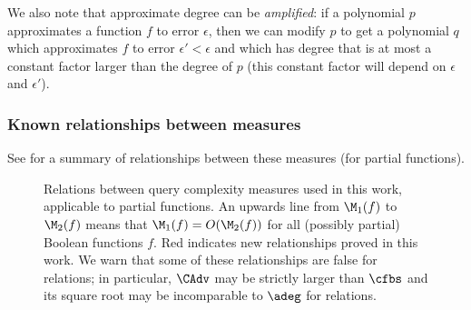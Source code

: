 We also note that approximate degree can be \emph{amplified}:
if a polynomial $p$ approximates a function $f$ to error
$\epsilon$, then we can modify $p$ to get a polynomial $q$
which approximates $f$ to error $\epsilon'<\epsilon$
and which has degree that is at most a constant factor
larger than the degree of $p$ (this constant
factor will depend on $\epsilon$ and $\epsilon'$).

\subsubsection{Known relationships between measures}

See  for a summary of relationships
between these measures (for partial functions).

\begin{figure}
\centering
    \caption{Relations between query complexity
    measures used in this work, applicable to partial functions.
    An upwards line from $\M_1(f)$ to $\M_2(f)$ means
    that $\M_1(f)=O(\M_2(f))$ for all (possibly partial) Boolean
    functions $f$. {\color{red}Red} indicates new
    relationships proved in this work.
    We warn that some of these relationships
    are false for relations; in particular, $\CAdv$ may
    be strictly larger than $\cfbs$ and its square root
    may be incomparable to $\adeg$ for relations.
    \label{fig:relations}}
\end{figure}


